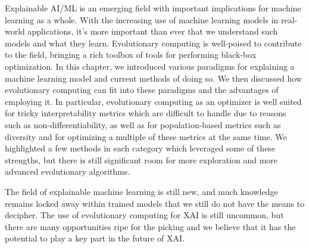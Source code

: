 \documentclass[graybox]{svmult}
\begin{document}
Explainable AI/ML is an emerging field with important implications for machine learning as a whole. With the increasing use of machine learning models in real-world applications, it's more important than ever that we understand such models and what they learn. Evolutionary computing is well-poised to contribute to the field, bringing a rich toolbox of tools for performing black-box optimization. In this chapter, we introduced various paradigms for explaining a machine learning model and current methods of doing so. We then discussed how evolutionary computing can fit into these paradigms and the advantages of employing it. In particular, evolutionary computing as an optimizer is well suited for tricky interpretability metrics which are difficult to handle due to reasons such as non-differentiability, as well as for population-based metrics such as diversity and for optimizing a multiple of these metrics at the same time. We highlighted a few methods in each category which leveraged some of these strengths, but there is still significant room for more exploration and more advanced evolutionary algorithms. 

The field of explainable machine learning is still new, and much knowledge remains locked away within trained models that we still do not have the means to decipher. The use of evolutionary computing for XAI is still uncommon, but there are many opportunities ripe for the picking and we believe that it has the potential to play a key part in the future of XAI.




\end{document}
